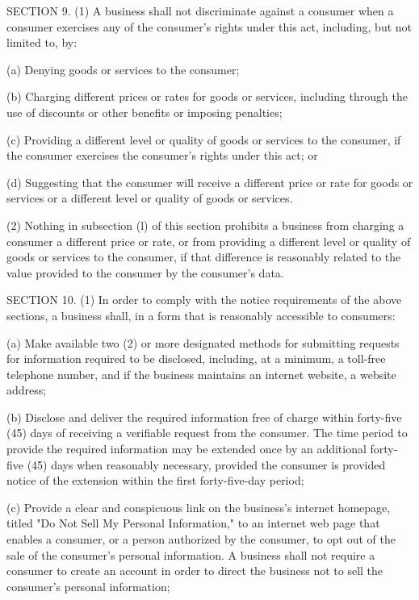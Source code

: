      SECTION 9.  (1)  A business shall not discriminate against a consumer when a consumer exercises any of the consumer's rights under this act, including, but not limited to, by:

          (a)  Denying goods or services to the consumer;

          (b)  Charging different prices or rates for goods or services, including through the use of discounts or other benefits or imposing penalties;

          (c)  Providing a different level or quality of goods or services to the consumer, if the consumer exercises the consumer's rights under this act; or

          (d)  Suggesting that the consumer will receive a different price or rate for goods or services or a different level or quality of goods or services.

     (2)  Nothing in subsection (l) of this section prohibits a business from charging a consumer a different price or rate, or from providing a different level or quality of goods or services to the consumer, if that difference is reasonably related to the value provided to the consumer by the consumer's data.

     SECTION 10.  (1)  In order to comply with the notice requirements of the above sections, a business shall, in a form that is reasonably accessible to consumers:

          (a)  Make available two (2) or more designated methods for submitting requests for information required to be disclosed, including, at a minimum, a toll-free telephone number, and if the business maintains an internet website, a website address;

          (b)  Disclose and deliver the required information free of charge within forty-five (45) days of receiving a verifiable request from the consumer.  The time period to provide the required information may be extended once by an additional forty-five (45) days when reasonably necessary, provided the consumer is provided notice of the extension within the first forty-five-day period;

          (c)  Provide a clear and conspicuous link on the business's internet homepage, titled "Do Not Sell My Personal Information," to an internet web page that enables a consumer, or a person authorized by the consumer, to opt out of the sale of the consumer's personal information.  A business shall not require a consumer to create an account in order to direct the business not to sell the consumer's personal information;

